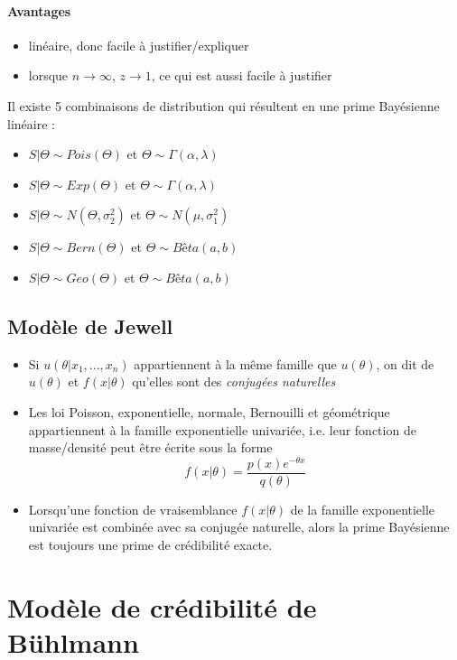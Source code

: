 \documentclass[10pt, french]{article}
\begin{document}
\begin{multicols*}{3}
\paragraph{Avantages}
\begin{itemize}
\item linéaire, donc facile à justifier/expliquer
\item lorsque $n \to \infty$, $z \to 1$, ce qui est aussi facile à justifier
\end{itemize}

Il existe 5 combinaisons de distribution qui résultent en une prime Bayésienne linéaire :
\begin{itemize}
\item $S | \Theta \sim Pois(\Theta)$ et $\Theta \sim \Gamma(\alpha, \lambda)$
\item $S | \Theta \sim Exp(\Theta)$ et $\Theta \sim \Gamma(\alpha, \lambda)$
\item $S | \Theta \sim N(\Theta, \sigma_2^2)$ et $\Theta \sim N(\mu, \sigma_1^2)$
\item $S | \Theta \sim Bern(\Theta)$ et $\Theta \sim Bêta(a,b)$
\item $S | \Theta \sim Geo(\Theta)$ et $\Theta \sim Bêta(a,b)$
\end{itemize}

\subsection*{Modèle de Jewell}
\begin{itemize}
\item Si $u(\theta | x_1, ..., x_n)$ appartiennent à la même famille que $u(\theta)$, on dit de $u(\theta)$ et $f(x | \theta)$ qu'elles sont des \emph{conjugées naturelles}
\item Les loi Poisson, exponentielle, normale, Bernouilli et géométrique appartiennent à la famille exponentielle univariée, i.e. leur fonction de masse/densité peut être écrite sous la forme
\[f(x | \theta) =  \frac{p(x) e^{-\theta x}}{q(\theta)}   \]

\item Lorsqu'une fonction de vraisemblance $f(x|\theta)$ de la famille exponentielle univariée est combinée avec sa conjugée naturelle, alors la prime Bayésienne est toujours une prime de crédibilité exacte.
\end{itemize}

\newpage
\section{Modèle de crédibilité de \\ Bühlmann}

\end{multicols*}
\end{document}
